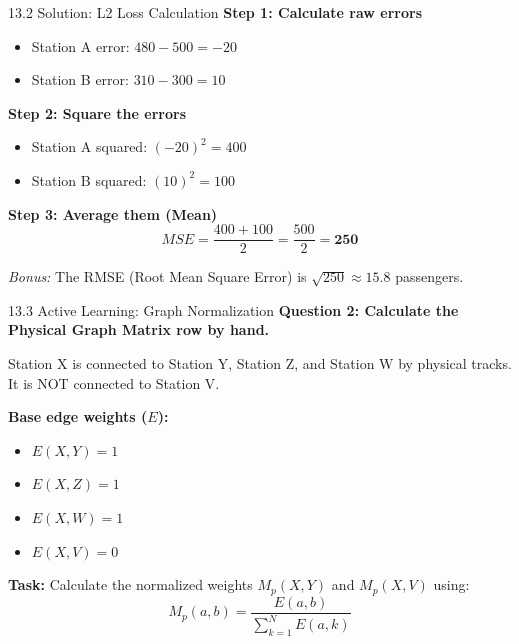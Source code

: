\documentclass[aspectratio=169]{beamer}
\begin{document}
\begin{frame}{13.2 Solution: L2 Loss Calculation}
  \textbf{Step 1: Calculate raw errors}
  \begin{itemize}
      \item Station A error: $480 - 500 = -20$
      \item Station B error: $310 - 300 = 10$
  \end{itemize}
  
  \textbf{Step 2: Square the errors}
  \begin{itemize}
      \item Station A squared: $(-20)^2 = 400$
      \item Station B squared: $(10)^2 = 100$
  \end{itemize}
  
  \textbf{Step 3: Average them (Mean)}
  $$ MSE = \frac{400 + 100}{2} = \frac{500}{2} = \mathbf{250} $$
  
  \vspace{0.2cm}
  \textit{Bonus:} The RMSE (Root Mean Square Error) is $\sqrt{250} \approx 15.8$ passengers.
\end{frame}

\begin{frame}{13.3 Active Learning: Graph Normalization}
  \textbf{Question 2: Calculate the Physical Graph Matrix row by hand.}
  
  Station X is connected to Station Y, Station Z, and Station W by physical tracks. It is NOT connected to Station V.
  
  \vspace{0.2cm}
  \textbf{Base edge weights ($E$):}
  \begin{itemize}
      \item $E(X, Y) = 1$
      \item $E(X, Z) = 1$
      \item $E(X, W) = 1$
      \item $E(X, V) = 0$
  \end{itemize}
  
  \vspace{0.2cm}
  \textbf{Task:} Calculate the normalized weights $M_p(X, Y)$ and $M_p(X, V)$ using:
  $$ M_{p}(a,b)=\frac{E(a,b)}{\sum_{k=1}^{N}E(a,k)} $$
\end{frame}
\end{document}
